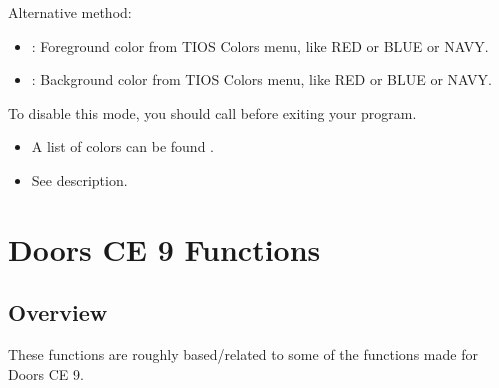 \documentclass[letterpaper,10pt,english]{sphinxmanual}
\begin{document}
\begin{description}
\begin{description}
\begin{itemize}
\end{itemize}

\end{description}

\sphinxAtStartPar
Alternative method: 
\begin{itemize}
\item {} 
\sphinxAtStartPar
{}: Foreground color from TI\sphinxhyphen{}OS Colors menu, like RED or BLUE or NAVY.

\item {} 
\sphinxAtStartPar
{}: Background color from TI\sphinxhyphen{}OS Colors menu, like RED or BLUE or NAVY.

\end{itemize}

\sphinxAtStartPar
To disable this mode, you should call  before exiting your program.
\begin{description}
\begin{itemize}
\item {} 
\sphinxAtStartPar
A list of colors can be found .

\end{itemize}

\begin{itemize}
\item {} 
\sphinxAtStartPar
See description.

\end{itemize}

\end{description}

\end{description}

\sphinxstepscope


\section{Doors CE 9 Functions}
\label{\detokenize{dcefunctions:doors-ce-9-functions}}\label{\detokenize{dcefunctions::doc}}

\subsection{Overview}
\label{\detokenize{dcefunctions:overview}}
\sphinxAtStartPar
These functions are roughly based/related to some of the functions made for Doors CE 9.
\end{document}
